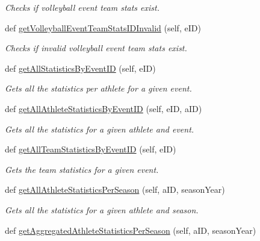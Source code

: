 \begin{DoxyCompactItemize}
\begin{DoxyCompactList}\small\item\em Checks if volleyball event team stats exist. \end{DoxyCompactList}\item 
def \hyperlink{classhandler_1_1dao_1_1volleyball__event__dao_1_1_volleyball_event_d_a_o_a9be2b3e3db29d818189bcd1c0cc3e16f}{get\+Volleyball\+Event\+Team\+Stats\+I\+D\+Invalid} (self, e\+ID)
\begin{DoxyCompactList}\small\item\em Checks if invalid volleyball event team stats exist. \end{DoxyCompactList}\item 
def \hyperlink{classhandler_1_1dao_1_1volleyball__event__dao_1_1_volleyball_event_d_a_o_a7fefc9189bb5e194897bf73d89324fe2}{get\+All\+Statistics\+By\+Event\+ID} (self, e\+ID)
\begin{DoxyCompactList}\small\item\em Gets all the statistics per athlete for a given event. \end{DoxyCompactList}\item 
def \hyperlink{classhandler_1_1dao_1_1volleyball__event__dao_1_1_volleyball_event_d_a_o_a3027982b71e04d8fa14f40f5fa896fc9}{get\+All\+Athlete\+Statistics\+By\+Event\+ID} (self, e\+ID, a\+ID)
\begin{DoxyCompactList}\small\item\em Gets all the statistics for a given athlete and event. \end{DoxyCompactList}\item 
def \hyperlink{classhandler_1_1dao_1_1volleyball__event__dao_1_1_volleyball_event_d_a_o_a07d3632ae537970ac89fc1eca8937df6}{get\+All\+Team\+Statistics\+By\+Event\+ID} (self, e\+ID)
\begin{DoxyCompactList}\small\item\em Gets the team statistics for a given event. \end{DoxyCompactList}\item 
def \hyperlink{classhandler_1_1dao_1_1volleyball__event__dao_1_1_volleyball_event_d_a_o_a07e2fadc0c0308559a511fee558b2b2c}{get\+All\+Athlete\+Statistics\+Per\+Season} (self, a\+ID, season\+Year)
\begin{DoxyCompactList}\small\item\em Gets all the statistics for a given athlete and season. \end{DoxyCompactList}\item 
def \hyperlink{classhandler_1_1dao_1_1volleyball__event__dao_1_1_volleyball_event_d_a_o_a06690eb7967d2674284ddf507e41c914}{get\+Aggregated\+Athlete\+Statistics\+Per\+Season} (self, a\+ID, season\+Year)

\end{DoxyCompactItemize}
